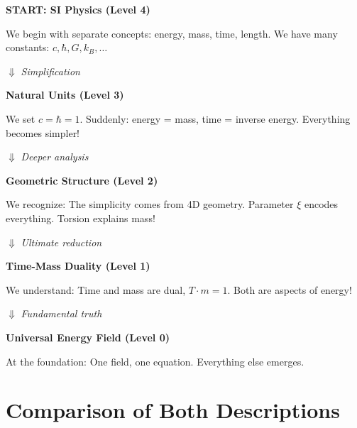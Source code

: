 	\begin{philosophical}
		\textbf{START: SI Physics (Level 4)}
		
		We begin with separate concepts: energy, mass, time, length. We have many constants: $c, \hbar, G, k_B, \ldots$
		
		\vspace{0.3cm}
		
		$\Downarrow$ \textit{Simplification}
		
		\vspace{0.3cm}
		
		\textbf{Natural Units (Level 3)}
		
		We set $c = \hbar = 1$. Suddenly: energy = mass, time = inverse energy. Everything becomes simpler!
		
		\vspace{0.3cm}
		
		$\Downarrow$ \textit{Deeper analysis}
		
		\vspace{0.3cm}
		
		\textbf{Geometric Structure (Level 2)}
		
		We recognize: The simplicity comes from 4D geometry. Parameter $\xi$ encodes everything. Torsion explains mass!
		
		\vspace{0.3cm}
		
		$\Downarrow$ \textit{Ultimate reduction}
		
		\vspace{0.3cm}
		
		\textbf{Time-Mass Duality (Level 1)}
		
		We understand: Time and mass are dual, $T \cdot m = 1$. Both are aspects of energy!
		
		\vspace{0.3cm}
		
		$\Downarrow$ \textit{Fundamental truth}
		
		\vspace{0.3cm}
		
		\textbf{Universal Energy Field (Level 0)}
		
		At the foundation: One field, one equation. Everything else emerges.
	\end{philosophical}
	
	\section{Comparison of Both Descriptions}
	
